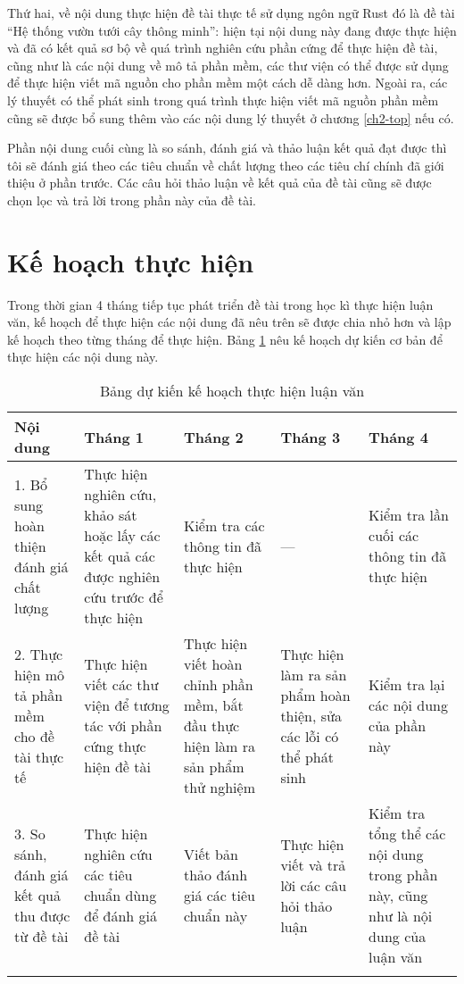 Thứ hai, về nội dung thực hiện đề tài thực tế sử dụng ngôn ngữ Rust đó là đề tài ``Hệ thống vườn tưới cây thông minh'': hiện tại nội dung này đang được thực hiện và đã có kết quả sơ bộ về quá trình nghiên cứu phần cứng để thực hiện đề tài, cũng như là các nội dung về mô tả phần mềm, các thư viện có thể được sử dụng để thực hiện viết mã nguồn cho phần mềm một cách dễ dàng hơn.
Ngoài ra, các lý thuyết có thể phát sinh trong quá trình thực hiện viết mã nguồn phần mềm cũng sẽ được bổ sung thêm vào các nội dung lý thuyết ở chương \ref{ch2-top} nếu có.

Phần nội dung cuối cùng là so sánh, đánh giá và thảo luận kết quả đạt được thì tôi sẽ đánh giá theo các tiêu chuẩn về chất lượng theo các tiêu chí chính đã giới thiệu ở phần trước.
Các câu hỏi thảo luận về kết quả của đề tài cũng sẽ được chọn lọc và trả lời trong phần này của đề tài.

\section{Kế hoạch thực hiện}
Trong thời gian 4 tháng tiếp tục phát triển đề tài trong học kì thực hiện luận văn, kế hoạch để thực hiện các nội dung đã nêu trên sẽ được chia nhỏ hơn và lập kế hoạch theo từng tháng để thực hiện.
Bảng \ref{tbl:plans} nêu kế hoạch dự kiến cơ bản để thực hiện các nội dung này.

\begin{longtable}{p{3cm} p{2.75cm} p{2.75cm} p{2.75cm} p{2.75cm}}
\textbf{Nội dung} & \textbf{Tháng 1} & \textbf{Tháng 2} & \textbf{Tháng 3} & \textbf{Tháng 4}\\
\midrule
\endhead
1. Bổ sung hoàn thiện đánh giá chất lượng & Thực hiện nghiên cứu, khảo sát hoặc lấy các kết quả các được nghiên cứu trước để thực hiện & Kiểm tra các thông tin đã thực hiện & --- & Kiểm tra lần cuối các thông tin đã thực hiện \\
2. Thực hiện mô tả phần mềm cho đề tài thực tế & Thực hiện viết các thư viện để tương tác với phần cứng thực hiện đề tài & Thực hiện viết hoàn chỉnh phần mềm, bắt đầu thực hiện làm ra sản phẩm thử nghiệm & Thực hiện làm ra sản phẩm hoàn thiện, sửa các lỗi có thể phát sinh & Kiểm tra lại các nội dung của phần này \\
3. So sánh, đánh giá kết quả thu được từ đề tài & Thực hiện nghiên cứu các tiêu chuẩn dùng để đánh giá đề tài & Viết bản thảo đánh giá các tiêu chuẩn này & Thực hiện viết và trả lời các câu hỏi thảo luận & Kiểm tra tổng thể các nội dung trong phần này, cũng như là nội dung của luận văn \\
\bottomrule
\caption{Bảng dự kiến kế hoạch thực hiện luận văn}
\label{tbl:plans}
\end{longtable}
